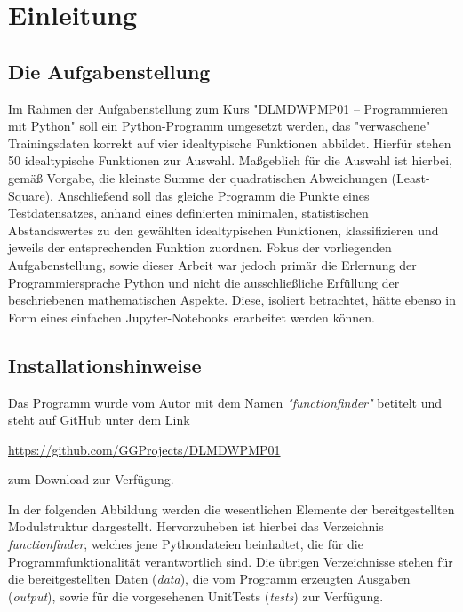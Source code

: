 \chapter{Einleitung}

\section{Die Aufgabenstellung}

Im Rahmen der Aufgabenstellung zum Kurs "DLMDWPMP01 – Programmieren mit Python" soll ein Python-Programm umgesetzt werden, das "verwaschene" Trainingsdaten korrekt auf vier idealtypische Funktionen abbildet. Hierfür stehen 50 idealtypische Funktionen zur Auswahl. Maßgeblich für die Auswahl ist hierbei, gemäß Vorgabe, die kleinste Summe der quadratischen Abweichungen (Least-Square).
Anschließend soll das gleiche Programm die Punkte eines Testdatensatzes, anhand eines definierten minimalen, statistischen Abstandswertes zu den gewählten idealtypischen Funktionen, klassifizieren und jeweils der entsprechenden Funktion zuordnen.
Fokus der vorliegenden Aufgabenstellung, sowie dieser Arbeit war jedoch primär die Erlernung der Programmiersprache Python und nicht die ausschließliche Erfüllung der beschriebenen mathematischen Aspekte. Diese, isoliert betrachtet, hätte ebenso in Form eines einfachen Jupyter-Notebooks erarbeitet werden können.


\section{Installationshinweise}

Das Programm wurde vom Autor mit dem Namen \emph{"functionfinder"} betitelt und steht auf GitHub unter dem Link \begin{center}\url{https://github.com/GGProjects/DLMDWPMP01}\end{center} zum Download zur Verfügung.

In der folgenden Abbildung werden die wesentlichen Elemente der bereitgestellten Modulstruktur dargestellt. Hervorzuheben ist hierbei das Verzeichnis \emph{functionfinder}, welches jene Pythondateien beinhaltet, die für die Programmfunktionalität verantwortlich sind.
Die übrigen Verzeichnisse stehen für die bereitgestellten Daten (\emph{data}), die vom Programm erzeugten Ausgaben (\emph{output}), sowie für die vorgesehenen UnitTests (\emph{tests}) zur Verfügung.

	
